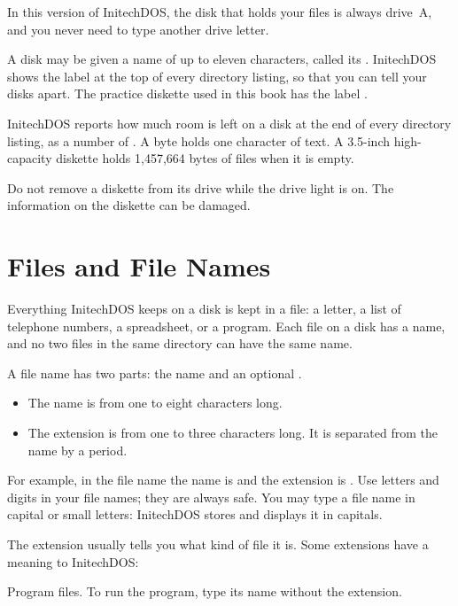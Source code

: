 In this version of InitechDOS, the disk that holds your files is always
drive~A, and you never need to type another drive letter.

A disk may be given a name of up to eleven characters,
called its .  InitechDOS shows the
label at the top of every directory listing, so that you can tell your
disks apart.  The practice diskette used in this book has the label
.

InitechDOS reports how much room is left on a disk at
the end of every directory listing, as a number of .  A byte
holds one character of text.  A 3.5-inch high-capacity diskette holds
1,457,664 bytes of files when it is empty.

\begin{Important}
Do not remove a diskette from its drive while the drive light is on.  The
information on the diskette can be damaged.
\end{Important}

\section{Files and File Names}
Everything InitechDOS keeps on a disk is kept in a file: a letter, a list of
telephone numbers, a spreadsheet, or a program.  Each file on a disk has a
name, and no two files in the same directory can have the same name.

A file name has two parts: the name and an optional
.
\begin{itemize}
\item The name is from one to eight characters long.
\item The extension is from one to three characters long.  It is separated
  from the name by a period.
\end{itemize}
For example, in the file name  the name is  and
the extension is .  Use letters and digits in your file names;
they are always safe.  You may type a file name in capital or small
letters: InitechDOS stores and displays it in capitals.

The extension usually tells you what kind of file it is.  Some extensions
have a meaning to InitechDOS:

Program files.  To run the program, type its name
without the extension.


